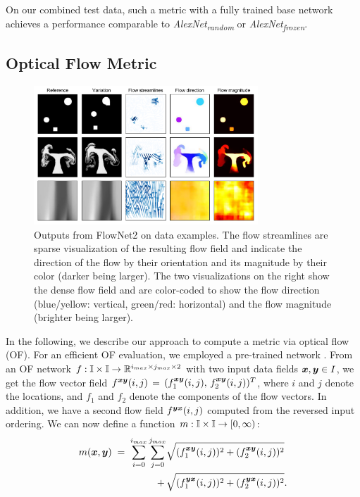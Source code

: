 On our combined test data, such a metric with a fully trained base network achieves a performance comparable to \textit{AlexNet\textsubscript{random}} or \textit{AlexNet\textsubscript{frozen}}.


\subsection{Optical Flow Metric}
\begin{figure}[ht]
    \centering
    \includegraphics[width=0.75\textwidth]{Images/OpticalFlow_small}
    \vspace{-0.5cm}
    \caption{Outputs from FlowNet2 on data examples. The flow streamlines are sparse visualization of the resulting flow field and indicate the direction of the flow by their orientation and its magnitude by their color (darker being larger). The two visualizations on the right show the dense flow field and are color-coded to show the flow direction (blue/yellow: vertical, green/red: horizontal) and the flow magnitude (brighter being larger).}
    \label{fig: optical flow}
\end{figure}
In the following, we describe our approach to compute a metric via optical flow (OF). For an efficient OF evaluation, we employed a pre-trained network \citep{ilg2016}.
From an OF network $f : {\mathbb{I}} \times {\mathbb{I}} \to {\mathbb{R}}^{i_{max} \times j_{max} \times 2}$ with two input data fields ${\bm{x}},{\bm{y}} \in I$, we get the flow vector field $f^{{\bm{x}}{\bm{y}}}(i,j) \,=\, ( f_1^{{\bm{x}}{\bm{y}}}(i,j),\, f_2^{{\bm{x}}{\bm{y}}}(i,j) )^T$, where $i$ and $j$ denote the locations, and $f_1$ and $f_2$ denote the components of the flow vectors. In addition, we have a second flow field $f^{{\bm{y}}{\bm{x}}}(i,j)$ computed from the reversed input ordering. We can now define a function $m : {\mathbb{I}} \times {\mathbb{I}} \to [0, \infty)$:
\begin{align*}
    m({\bm{x}},{\bm{y}}) \;=\; \sum_{i=0}^{i_{max}} \sum_{j=0}^{j_{max}} &\sqrt{(f^{{\bm{x}}{\bm{y}}}_1(i,j))^2 + (f^{{\bm{x}}{\bm{y}}}_2(i,j))^2} \\
    \,+\, &\sqrt{(f^{{\bm{y}}{\bm{x}}}_1(i,j))^2 + (f^{{\bm{y}}{\bm{x}}}_2(i,j))^2}.
\end{align*}
